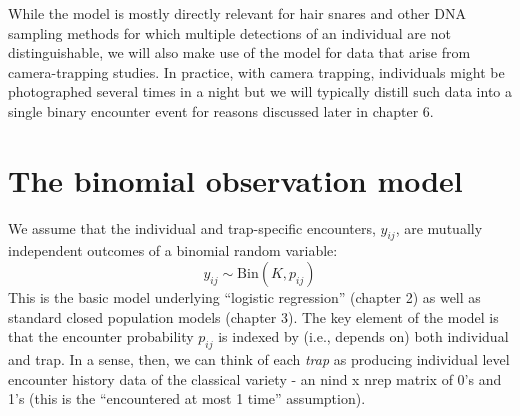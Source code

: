 While the model is mostly directly relevant
for hair snares and other DNA sampling methods for which multiple
detections of an individual are not distinguishable, 
we will also make use of the model for data that arise from
camera-trapping studies. In practice, with camera trapping,
individuals might be photographed several times in a night but we will
typically distill such data into a single binary encounter event for
reasons discussed later in chapter 6.


\section{The binomial observation model }

We assume that the individual and trap-specific encounters, $y_{ij}$,
are mutually independent outcomes of a binomial random variable:
\begin{equation}
	y_{ij} \sim \mbox{Bin}(K, p_{ij})
\label{scr0.eq.bin}
\end{equation}
This is the basic model underlying ``logistic regression'' (chapter 2)
as well as standard closed population models (chapter 3). The key
element of the model is that the encounter probability $p_{ij}$ is
indexed by (i.e., depends on) both individual and trap. In a sense,
then, we can think of each {\it trap} as producing individual level
encounter history data of the classical variety - an nind x nrep
matrix of 0's and 1's (this is the ``encountered at most 1 time''
assumption).


